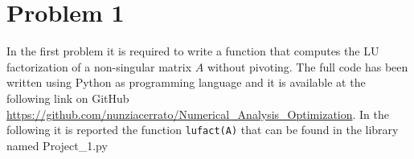\documentclass[a4paper,11pt]{report}
\begin{document}
	
\section*{Problem 1}
In the first problem it is required to write a function that computes the LU factorization of a non-singular matrix $A$ without pivoting. The full code has been written using Python as programming language and it is available at the following link on GitHub \url{https://github.com/nunziacerrato/Numerical_Analysis_Optimization}.
In the following it is reported the function \texttt{lufact(A)} that can be found in the library named Project\_1.py
\end{document}
